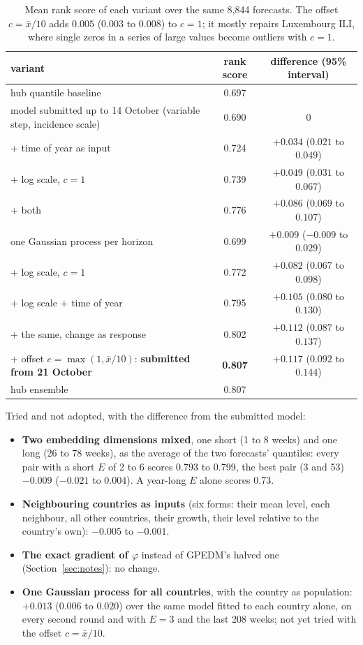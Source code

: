 \documentclass[11pt,a4paper]{article}
\numberwithin{equation}{section}
\begin{document}
\begin{table}[htbp]
\centering\small
\begin{tabular}{@{}lcc@{}}
\toprule
variant & rank score & difference (95\% interval) \\
\midrule
hub quantile baseline & 0.697 & \\
model submitted up to 14 October (variable step, incidence scale) & 0.690 & 0 \\
\quad + time of year as input & 0.724 & $+0.034$ ($0.021$ to $0.049$) \\
\quad + log scale, $c=1$ & 0.739 & $+0.049$ ($0.031$ to $0.067$) \\
\quad + both & 0.776 & $+0.086$ ($0.069$ to $0.107$) \\
one Gaussian process per horizon & 0.699 & $+0.009$ ($-0.009$ to $0.029$) \\
\quad + log scale, $c=1$ & 0.772 & $+0.082$ ($0.067$ to $0.098$) \\
\quad + log scale + time of year & 0.795 & $+0.105$ ($0.080$ to $0.130$) \\
\quad + the same, change as response & 0.802 & $+0.112$ ($0.087$ to $0.137$) \\
\quad + offset $c=\max(1,\bar x/10)$: \textbf{submitted from 21 October} & \textbf{0.807} & $+0.117$ ($0.092$ to $0.144$) \\
hub ensemble & 0.807 & \\
\bottomrule
\end{tabular}
\caption{Mean rank score of each variant over the same 8,844 forecasts. The offset $c=\bar x/10$ adds
$0.005$ ($0.003$ to $0.008$) to $c=1$; it mostly repairs Luxembourg ILI, where single zeros in a series
of large values become outliers with $c=1$.}
\label{tab:replay}
\end{table}

Tried and not adopted, with the difference from the submitted model:
\begin{itemize}
\item \textbf{Two embedding dimensions mixed}, one short (1 to 8 weeks) and one long (26 to 78 weeks), as
the average of the two forecasts' quantiles: every pair with a short $E$ of 2 to 6 scores 0.793 to 0.799,
the best pair (3 and 53) $-0.009$ ($-0.021$ to $0.004$). A year-long $E$ alone scores 0.73.
\item \textbf{Neighbouring countries as inputs} (six forms: their mean level, each neighbour, all other
countries, their growth, their level relative to the country's own): $-0.005$ to $-0.001$.
\item \textbf{The exact gradient of $\varphi$} instead of GPEDM's halved one (Section~\ref{sec:notes}):
no change.
\item \textbf{One Gaussian process for all countries}, with the country as population: $+0.013$ ($0.006$
to $0.020$) over the same model fitted to each country alone, on every second round and with $E=3$ and
the last 208 weeks; not yet tried with the offset $c=\bar x/10$.
\end{itemize}
\end{document}
